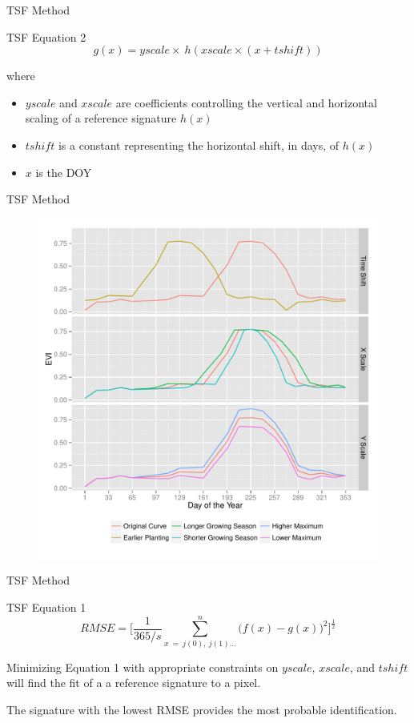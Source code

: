 \documentclass[draft,compress]{beamer}
\begin{document}
\begin{frame}{TSF Method}
\begin{block}{TSF Equation 2}
  \begin{equation*}
    g(x) = yscale\times~h\left(xscale\times(x + tshift)\right)
  \end{equation*}
\end{block}
\vspace{0.5\baselineskip}
where
\begin{itemize}
  \item $yscale$ and  $xscale$ are coefficients controlling the vertical and horizontal scaling of a reference signature $h(x)$
  \item $tshift$ is a constant representing the horizontal shift, in days, of $h(x)$
  \item $x$ is the DOY
\end{itemize}
\end{frame}

\begin{frame}{TSF Method}
\begin{figure}
  \centering
  \includegraphics[width=0.7\linewidth]{Graphics/transformations.pdf}
\end{figure}
\end{frame}

\begin{frame}{TSF Method}
\begin{block}{TSF Equation 1}
  \begin{equation*}
    RMSE = \biggl[\frac{1}{365/s}\sum_{x\ =\ j(0),\ j(1)\ldots}^{n}\bigl(f\left(x\right)-g\left(x\right)\bigr)^{2}\biggr]^{\frac{1}{2}}
  \end{equation*}
\end{block}
\vspace{0.5\baselineskip}
Minimizing Equation 1 with appropriate constraints on $yscale$, $xscale$, and $tshift$ will find the fit of a a reference signature to a pixel.

\alert<2>{The signature with the lowest RMSE provides the most probable identification.}
\end{frame}
\end{document}
